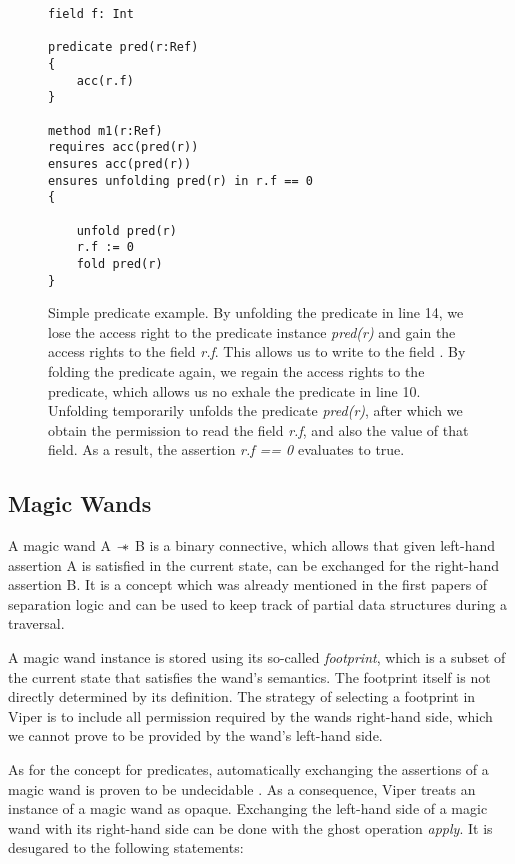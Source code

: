 \documentclass[12pt]{article}
\begin{document}
\begin{figure}[h]
  \centering
\begin{lstlisting}
field f: Int

predicate pred(r:Ref)
{
    acc(r.f)
}

method m1(r:Ref)
requires acc(pred(r))
ensures acc(pred(r))
ensures unfolding pred(r) in r.f == 0
{

    unfold pred(r)
    r.f := 0
    fold pred(r)
}
\end{lstlisting}
\caption[predicate example]
   {Simple predicate example. By unfolding the predicate in line 14, we lose the access right to the predicate instance \textit{pred(r)} and gain the access rights to the field \textit{r.f}. This allows us to write to the field . By folding the predicate again, we regain the access rights to the predicate, which allows us no exhale the predicate in line 10. Unfolding temporarily unfolds the predicate \textit{pred(r)}, after which we obtain the permission to read the field \textit{r.f}, and also the value of that field. As a result, the assertion \textit{r.f == 0} evaluates to true.}
\label{predicateExample}
\end{figure}

\subsection{Magic Wands}
A magic wand A \(\mathbin{-\!\!*}\) B is a binary connective, which allows that given left-hand assertion A is satisfied in the current state, can be exchanged for the right-hand assertion B. It is a concept which was already mentioned in the first papers of separation logic\cite{reynolds2002separation} and can be used to keep track of partial data structures during a traversal.

A magic wand instance is stored using its so-called \textit{footprint}, which is a subset of the current state that satisfies the wand's semantics. The footprint itself is not directly determined by its definition. The strategy of selecting a footprint in Viper is to include all permission required by the wands right-hand side, which we cannot prove to be provided by the wand's left-hand side\cite{magicwand}.

As for the concept for predicates, automatically exchanging the assertions of a magic wand is proven to be undecidable \cite{brochenin2008almighty}. As a consequence, Viper treats an instance of a magic wand as opaque. Exchanging the left-hand side of a magic wand with its right-hand side can be done with the ghost operation \textit{apply}. It is desugared to the following statements:
\end{document}
